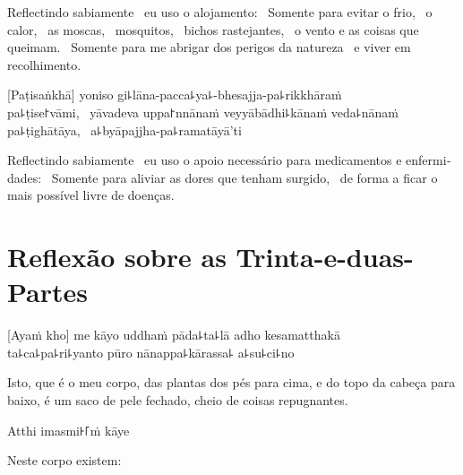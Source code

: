 \begin{english}
  Reflectindo sabiamente \pause\ eu uso o alojamento: \pause\ Somente para evitar o
  frio, \pause\ o calor, \pause\ as moscas, \pause\ mosquitos, \pause\ bichos
  rastejantes, \pause\ o vento e as coisas que queimam. \pause\ Somente para me
  abrigar dos perigos da natureza \pause\ e viver em recolhimento.
\end{english}

[Paṭisaṅkhā] yoniso gi꜕lāna-pacca꜕ya꜕-bhesajja-pa꜕rikkhāraṁ\\
pa꜕ṭise꜓vāmi, \pause\ yāvadeva uppa꜓nnānaṁ veyyābādhi꜕kānaṁ veda꜕nānaṁ
pa꜕ṭighātāya, \pause\ a꜕byāpajjha-pa꜕ramatāyā'ti

\begin{english}
  Reflectindo sabiamente \pause\ eu uso o apoio necessário para medicamentos e
  enfermidades: \pause\ Somente para aliviar as dores que tenham surgido,
  \pause\ de forma a ficar o mais possível livre de doenças.
\end{english}

\chapter[Trinta-e-duas-Partes]{Reflexão sobre as Trinta-e-duas-Partes}


\begin{leader}
\end{leader}

[Ayaṁ kho] me kāyo uddhaṁ pāda꜕ta꜕lā adho kesamatthakā\\
ta꜕ca꜕pa꜕ri꜕yanto pūro nānappa꜕kārassa꜕ a꜕su꜕ci꜕no

\begin{english}
  Isto, que é o meu corpo, das plantas dos pés para cima, e do topo da cabeça para baixo, é um saco de pele fechado, cheio de coisas repugnantes.
\end{english}

Atthi imasmi꜔꜒ṁ kāye

\begin{english}
  Neste corpo existem:
\end{english}

